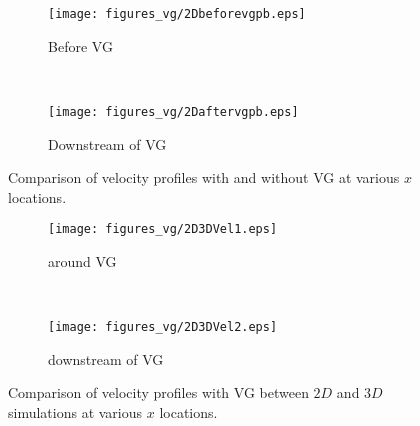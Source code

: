 \begin{figure}[h!]
    \centering
    \captionsetup{justification=centering}
    \begin{subfigure}[b]{0.45\textwidth}
    \captionsetup{justification=centering}
        \texttt{[image: figures\_vg/2Dbeforevgpb.eps]}
        \caption{Before VG}
        \label{fig:velprcl}
    \end{subfigure}
    ~ %
    \begin{subfigure}[b]{0.45\textwidth}
    \centering
    \captionsetup{justification=centering}
        \texttt{[image: figures\_vg/2Daftervgpb.eps]}
        \caption{Downstream of VG}
        \label{fig:velpr}
    \end{subfigure}
    \caption{Comparison of velocity profiles with and without VG at various $x$ locations.}
    \label{fig:velprofile}
\end{figure}
\begin{figure}[h!]
    \centering
    \captionsetup{justification=centering}
    \begin{subfigure}[b]{0.45\textwidth}
    \captionsetup{justification=centering}
        \texttt{[image: figures\_vg/2D3DVel1.eps]}
        \caption{around VG}
        \label{fig:2d3dcl}
    \end{subfigure}
    ~ %
    \begin{subfigure}[b]{0.45\textwidth}
    \centering
    \captionsetup{justification=centering}
        \texttt{[image: figures\_vg/2D3DVel2.eps]}
        \caption{downstream of VG}
        \label{fig:2d3dfar}
    \end{subfigure}
    \caption{Comparison of velocity profiles with VG between $2D$ and $3D$ simulations at various $x$ locations.}
    \label{fig:2d3dvgvel}
\end{figure}

